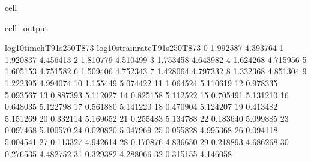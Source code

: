 \documentclass[letterpaper,10pt,english]{jupyterBook}
\begin{document}
\begin{sphinxuseclass}{cell}
\begin{sphinxVerbatimOutput}
\begin{sphinxuseclass}{cell_output}
\begin{sphinxVerbatim}[commandchars=\\\{\}]
					log10timeh\PYGZus{}T91s250T873  log10strainrate\PYGZus{}T91s250T873  \PYGZbs{}
					0                \PYGZhy{}1.992587                    \PYGZhy{}4.393764   
					1                \PYGZhy{}1.920837                    \PYGZhy{}4.456413   
					2                \PYGZhy{}1.810779                    \PYGZhy{}4.510499   
					3                \PYGZhy{}1.753458                    \PYGZhy{}4.643982   
					4                \PYGZhy{}1.624268                    \PYGZhy{}4.715956   
					5                \PYGZhy{}1.605153                    \PYGZhy{}4.751582   
					6                \PYGZhy{}1.509406                    \PYGZhy{}4.752343   
					7                \PYGZhy{}1.428064                    \PYGZhy{}4.797332   
					8                \PYGZhy{}1.332368                    \PYGZhy{}4.851304   
					9                \PYGZhy{}1.222395                    \PYGZhy{}4.994074   
					10               \PYGZhy{}1.155449                    \PYGZhy{}5.074422   
					11               \PYGZhy{}1.064524                    \PYGZhy{}5.110619   
					12               \PYGZhy{}0.978335                    \PYGZhy{}5.093567   
					13               \PYGZhy{}0.887393                    \PYGZhy{}5.112027   
					14               \PYGZhy{}0.825158                    \PYGZhy{}5.112522   
					15               \PYGZhy{}0.705491                    \PYGZhy{}5.131210   
					16               \PYGZhy{}0.648035                    \PYGZhy{}5.122798   
					17               \PYGZhy{}0.561880                    \PYGZhy{}5.141220   
					18               \PYGZhy{}0.470904                    \PYGZhy{}5.124207   
					19               \PYGZhy{}0.413482                    \PYGZhy{}5.151269   
					20               \PYGZhy{}0.332114                    \PYGZhy{}5.169652   
					21               \PYGZhy{}0.255483                    \PYGZhy{}5.134788   
					22               \PYGZhy{}0.183640                    \PYGZhy{}5.099885   
					23               \PYGZhy{}0.097468                    \PYGZhy{}5.100570   
					24               \PYGZhy{}0.020820                    \PYGZhy{}5.047969   
					25                0.055828                    \PYGZhy{}4.995368   
					26                0.094118                    \PYGZhy{}5.004541   
					27                0.113327                    \PYGZhy{}4.942614   
					28                0.170876                    \PYGZhy{}4.836650   
					29                0.218893                    \PYGZhy{}4.686268   
					30                0.276535                    \PYGZhy{}4.482752   
					31                0.329382                    \PYGZhy{}4.288066   
					32                0.315155                    \PYGZhy{}4.146058   

\end{sphinxVerbatim}
\end{sphinxuseclass}
\end{sphinxVerbatimOutput}
\end{sphinxuseclass}
\end{document}
